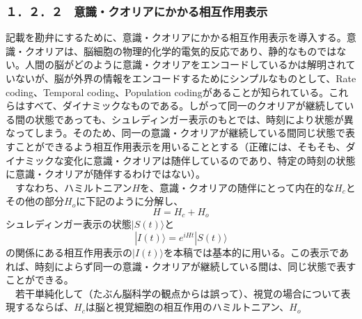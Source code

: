 \subsubsection{１．２．２　意識・クオリアにかかる相互作用表示}
記載を勘弁にするために、意識・クオリアにかかる相互作用表示を導入する。意識・クオリアは、脳細胞の物理的化学的電気的反応であり、静的なものではない。人間の脳がどのように意識・クオリアをエンコードしているかは解明されていないが、脳が外界の情報をエンコードするためにシンプルなものとして、Rate coding、Temporal coding、Population codingがあることが知られている\cite{wikipediac}。これらはすべて、ダイナミックなものである。しがって同一のクオリアが継続している間の状態であっても、シュレディンガー表示のもとでは、時刻により状態が異なってしまう。そのため、同一の意識・クオリアが継続している間同じ状態で表すことができるよう相互作用表示を用いることとする（正確には、そもそも、ダイナミックな変化に意識・クオリアは随伴しているのであり、特定の時刻の状態に意識・クオリアが随伴するわけではない）。\\
　すなわち、ハミルトニアン$H$を、意識・クオリアの随伴にとって内在的な$H_c$とその他の部分$H_o$に下記のように分解し、
　\begin{equation}
  H=H_c + H_o
\end{equation}
シュレディンガー表示の状態$|S(t)\rangle$と
　\begin{equation}
  |I(t)\rangle = e^{iHt}|S(t)\rangle
\end{equation}
の関係にある相互作用表示の$|I(t)\rangle$を本稿では基本的に用いる。この表示であれば、時刻によらず同一の意識・クオリアが継続している間は、同じ状態で表すことができる。\\
　若干単純化して（たぶん脳科学の観点からは誤って）、視覚の場合について表現するならば、$H_c$は脳と視覚細胞の相互作用のハミルトニアン、$H_o$

